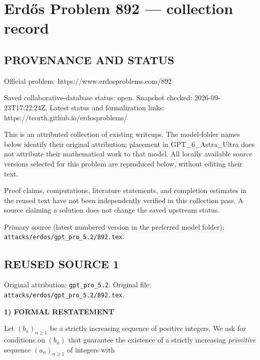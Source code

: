 \section*{Erd\H{o}s Problem 892 --- collection record}

\subsection*{PROVENANCE AND STATUS}
Official problem: https://www.erdosproblems.com/892

Saved collaborative-database status: open.
Snapshot checked: 2026-09-23T17:22:24Z.
Latest status and formalization links: https://teorth.github.io/erdosproblems/

This is an attributed collection of existing writeups. The model-folder names below identify their original attribution; placement in GPT\_6\_Astra\_Ultra does not attribute their mathematical work to that model. All locally available source versions selected for this problem are reproduced below, without editing their text.

Proof claims, computations, literature statements, and completion estimates in the reused text have not been independently verified in this collection pass. A source claiming a solution does not change the saved upstream status.

Primary source (latest numbered version in the preferred model folder): \texttt{attacks/erdos/gpt\_pro\_5.2/892.tex}.

\subsection*{REUSED SOURCE 1}
Original attribution: \texttt{gpt\_pro\_5.2}.
Original file: \texttt{attacks/erdos/gpt\_pro\_5.2/892.tex}.




\noindent\textbf{1) FORMAL RESTATEMENT}

Let $(b_n)_{n\ge 1}$ be a strictly increasing sequence of positive integers.
We ask for conditions on $(b_n)$ that guarantee the existence of a strictly
increasing \emph{primitive} sequence $(a_n)_{n\ge 1}$ of integers with


